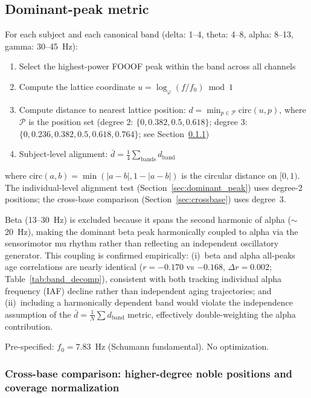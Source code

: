 \documentclass[11pt,a4paper]{article}
\newcommand{\phisym}{\varphi}
\newcommand{\fzero}{f_0}
\begin{document}
\subsection{Dominant-peak metric}

For each subject and each canonical band (delta: 1--4, theta: 4--8, alpha: 8--13, gamma: 30--45~Hz):
\begin{enumerate}
    \item Select the highest-power FOOOF peak within the band across all channels
    \item Compute the lattice coordinate $u = \log_\phisym(f/\fzero) \bmod 1$
    \item Compute distance to nearest lattice position: $d = \min_{p \in \mathcal{P}} \text{circ}(u, p)$, where $\mathcal{P}$ is the position set (degree 2: $\{0, 0.382, 0.5, 0.618\}$; degree 3: $\{0, 0.236, 0.382, 0.5, 0.618, 0.764\}$; see Section~\ref{sec:crossbase_methods})
    \item Subject-level alignment: $\bar{d} = \frac{1}{4}\sum_{\text{bands}} d_{\text{band}}$
\end{enumerate}
where $\text{circ}(a, b) = \min(|a - b|, 1 - |a - b|)$ is the circular distance on $[0, 1)$. The individual-level alignment test (Section~\ref{sec:dominant_peak}) uses degree-2 positions; the cross-base comparison (Section~\ref{sec:crossbase}) uses degree~3.

Beta (13--30~Hz) is excluded because it spans the second harmonic of alpha ($\sim$20~Hz), making the dominant beta peak harmonically coupled to alpha via the sensorimotor mu rhythm \parencite{Pfurtscheller1999} rather than reflecting an independent oscillatory generator. This coupling is confirmed empirically: (i)~beta and alpha all-peaks age correlations are nearly identical ($r = -0.170$ vs $-0.168$, $\Delta r = 0.002$; Table~\ref{tab:band_decomp}), consistent with both tracking individual alpha frequency (IAF) decline rather than independent aging trajectories; and (ii)~including a harmonically dependent band would violate the independence assumption of the $\bar{d} = \frac{1}{N}\sum d_{\text{band}}$ metric, effectively double-weighting the alpha contribution.

Pre-specified: $\fzero = 7.83$~Hz (Schumann fundamental). No optimization.

\subsubsection{Cross-base comparison: higher-degree noble positions and coverage normalization}
\label{sec:crossbase_methods}
\end{document}
